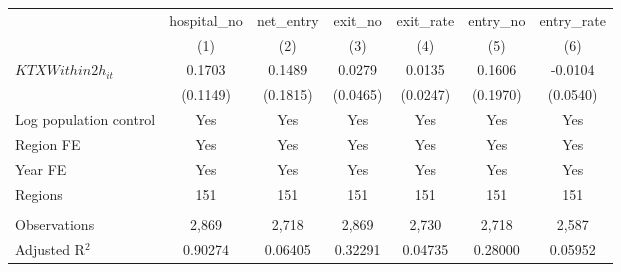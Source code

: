 \begingroup
\centering
\begin{tabular}{lcccccc}
   \toprule
                          & hospital\_no  & net\_entry  & exit\_no  & exit\_rate  & entry\_no  & entry\_rate \\    
                          & (1)           & (2)         & (3)       & (4)         & (5)        & (6)\\  
   \midrule 
   $KTXWithin2h_{it}$     & 0.1703        & 0.1489      & 0.0279    & 0.0135      & 0.1606     & -0.0104\\   
                          & (0.1149)      & (0.1815)    & (0.0465)  & (0.0247)    & (0.1970)   & (0.0540)\\   
   Log population control & Yes           & Yes         & Yes       & Yes         & Yes        & Yes\\  
   Region FE              & Yes           & Yes         & Yes       & Yes         & Yes        & Yes\\  
   Year FE                & Yes           & Yes         & Yes       & Yes         & Yes        & Yes\\  
   Regions                & 151           & 151         & 151       & 151         & 151        & 151\\  
    \\
   Observations           & 2,869         & 2,718       & 2,869     & 2,730       & 2,718      & 2,587\\  
   Adjusted R$^2$         & 0.90274       & 0.06405     & 0.32291   & 0.04735     & 0.28000    & 0.05952\\  
   \bottomrule
\end{tabular}
\par\endgroup
